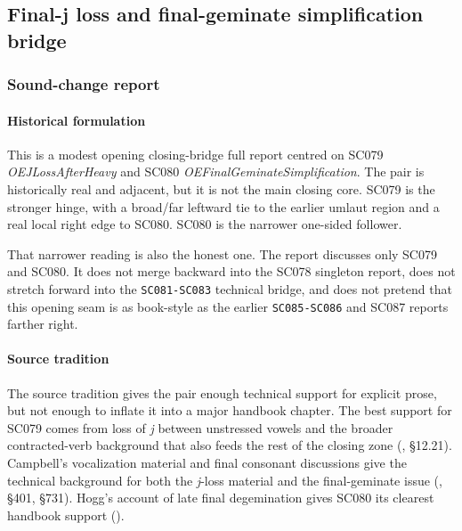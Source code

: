 \documentclass[
  british,
  a4paper,
]{article}
\begin{document}
\subsection{Final-j loss and final-geminate simplification
bridge}\label{final-j-loss-and-final-geminate-simplification-bridge}

\subsubsection{Sound-change report}\label{sound-change-report-49}

\paragraph{Historical formulation}\label{historical-formulation-49}

This is a modest opening closing-bridge full report centred on SC079
\emph{OEJLossAfterHeavy} and SC080 \emph{OEFinalGeminateSimplification}.
The pair is historically real and adjacent, but it is not the main
closing core. SC079 is the stronger hinge, with a broad/far leftward tie
to the earlier umlaut region and a real local right edge to SC080. SC080
is the narrower one-sided follower.

That narrower reading is also the honest one. The report discusses only
SC079 and SC080. It does not merge backward into the SC078 singleton
report, does not stretch forward into the \texttt{SC081-SC083} technical
bridge, and does not pretend that this opening seam is as book-style as
the earlier \texttt{SC085-SC086} and SC087 reports farther right.

\paragraph{Source tradition}\label{source-tradition-49}

The source tradition gives the pair enough technical support for
explicit prose, but not enough to inflate it into a major handbook
chapter. The best support for SC079 comes from loss of \emph{j} between
unstressed vowels and the broader contracted-verb background that also
feeds the rest of the closing zone (, §12.21). Campbell's vocalization material and final
consonant discussions give the technical background for both the
\emph{j}-loss material and the final-geminate issue
(, §401,
§731). Hogg's account of late final degemination gives SC080 its
clearest handbook support ().
\end{document}

